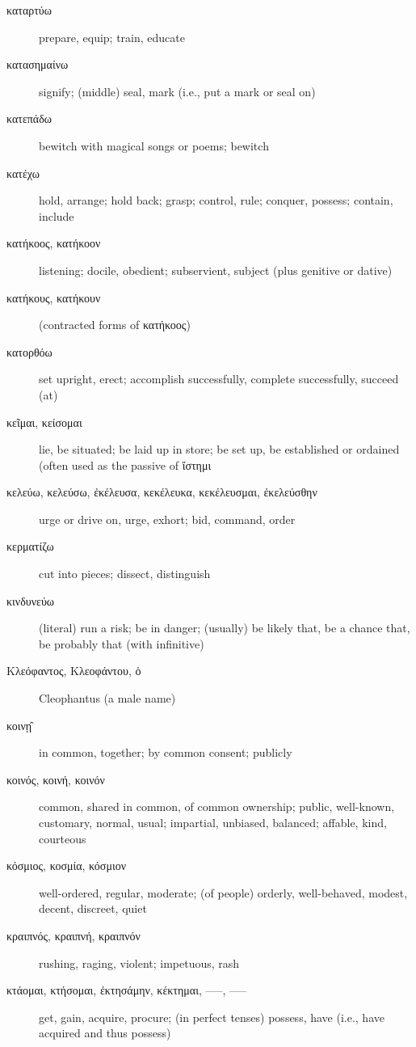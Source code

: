 \documentclass[12pt,letterpaper]{article}
\begin{document}
\begin{description}
    \item[\textgreek{καταρτύω}] prepare, equip; train, educate
    \item[\textgreek{κατασημαίνω}] signify; (middle) seal, mark (i.e., put a mark or seal on)
    \item[\textgreek{κατεπάδω}] bewitch with magical songs or poems; bewitch
    \item[\textgreek{κατέχω}] hold, arrange; hold back; grasp; control, rule; conquer, possess; contain, include
    \item[\textgreek{κατήκοος, κατήκοον}] listening; docile, obedient; subservient, subject (plus genitive or dative)
    \item[\textgreek{κατήκους, κατήκουν}] (contracted forms of \textgreek{κατήκοος})
    \item[\textgreek{κατορθόω}] set upright, erect; accomplish successfully, complete successfully, succeed (at)
    \item[\textgreek{κεῖμαι, κείσομαι}] \marginnote{*}lie, be situated; be laid up in store; be set up, be established or ordained (often used as the passive of \textgreek{ἵστημι}
    \item[\textgreek{κελεύω, κελεύσω, ἐκέλευσα, κεκέλευκα, κεκέλευσμαι, ἐκελεύσθην}] \marginnote{*}urge or drive on, urge, exhort; bid, command, order
    \item[\textgreek{κερματίζω}] cut into pieces; dissect, distinguish
    \item[\textgreek{κινδυνεύω}] (literal) run a risk; be in danger; (usually) be likely that, be a chance that, be probably that (with infinitive)
    \item[\textgreek{Κλεόφαντος, Κλεοφάντου, ὁ}] Cleophantus (a male name)
    \item[\textgreek{κοινῃ̂}] in common, together; by common consent; publicly
    \item[\textgreek{κοινός, κοινή, κοινόν}] \marginnote{*}common, shared in common, of common ownership; public, well-known, customary, normal, usual; impartial, unbiased, balanced; affable, kind, courteous
    \item[\textgreek{κόσμιος, κοσμία, κόσμιον}] well-ordered, regular, moderate; (of people) orderly, well-behaved, modest, decent, discreet, quiet
    \item[\textgreek{κραιπνός, κραιπνή, κραιπνόν}] rushing, raging, violent; impetuous, rash
    \item[\textgreek{κτάομαι, κτήσομαι, ἐκτησάμην, κέκτημαι, –––, –––}] \marginnote{*}get, gain, acquire, procure; (in perfect tenses) possess, have (i.e., have acquired and thus possess)

\end{description}
\end{document}
